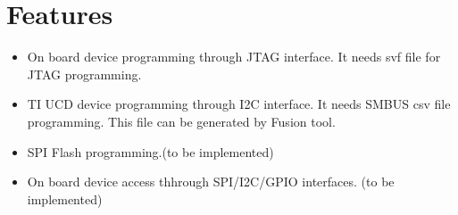 	

\section{Features}
\begin{itemize}
	\item
	On board device programming through JTAG interface. It needs svf file for JTAG programming.
	
	\item
	TI UCD device programming through I2C interface. It needs SMBUS csv file programming. This file can be
	generated by Fusion tool.
	
	\item
	SPI Flash programming.(to be implemented)
	
	\item
	On board device access thhrough SPI/I2C/GPIO interfaces. (to be implemented)

\end{itemize}	

	

